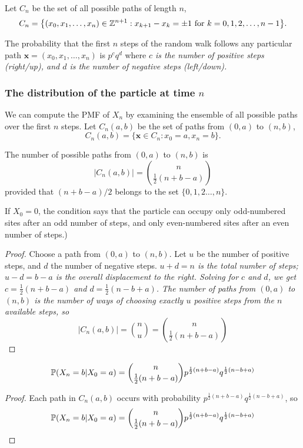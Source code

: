 Let $C_n$ be the set of all possible paths of length $n$,
\[
C_n = \big\{(x_0,x_1,\ldots,x_n)\in\mathbb{Z}^{n+1}: x_{k+1}-x_k = \pm 1\text{ for } k=0,1,2,\ldots,n-1\big\}.
\]

The probability that the first $n$ steps of the random walk follows any particular path $\mathbf{x}=(x_0,x_1,\ldots,x_n)$ is $p^cq^d$ where
\bit
\it $c$ is the number of positive steps (right/up), and
\it $d$ is the number of negative steps (left/down).
\eit

\subsubsection{The distribution of the particle at time $n$}
We can compute the PMF of $X_n$ by examining the ensemble of all possible paths over the first $n$ steps. Let $C_n(a,b)$ be the set of paths from $(0,a)$ to $(n,b)$,
\[
C_n(a,b) = \big\{\mathbf{x}\in C_n: x_0=a, x_n=b\}.
\]

\begin{lemma}
The number of possible paths from $(0,a)$ to $(n,b)$ is 
\[
|C_n(a,b)| = \binom{n}{\frac{1}{2}(n+b-a)}
\]
provided that $(n+b-a)/2$ belongs to the set $\{0,1,2\ldots,n\}$. 
\end{lemma}
If $X_0=0$, the condition says that the particle can occupy only odd-numbered sites after an odd number of steps, and only even-numbered sites after an even number of steps.)

\begin{proof}
Choose a path from $(0,a)$ to $(n,b)$. Let $u$ be the number of positive steps, and $d$ the number of negative steps.
\bit
\it $u+d=n$ is the total number of steps;
\it $u-d=b-a$ is the overall displacement to the right.
\eit
Solving for $c$ and $d$, we get $c=\frac{1}{2}(n+b-a)$ and $d=\frac{1}{2}(n-b+a)$. The number of paths from $(0,a)$ to $(n,b)$ is the number of ways of choosing exactly $u$ positive steps from the $n$ available steps, so
\[
|C_n(a,b)| = \binom{n}{u} = \binom{n}{\frac{1}{2}(n+b-a)}
\]
\end{proof}

\begin{corollary}
\[
\mathbb{P}(X_n=b|X_0=a) = \binom{n}{\frac{1}{2}(n+b-a)}p^{\frac{1}{2}(n+b-a)}q^{\frac{1}{2}(n-b+a)}
\]
\end{corollary}
\begin{proof}
Each path in $C_n(a,b)$ occurs with probability $p^{\frac{1}{2}(n+b-a)}q^{\frac{1}{2}(n-b+a)}$, so
\[
\mathbb{P}(X_n=b|X_0=a) = \binom{n}{\frac{1}{2}(n+b-a)}p^{\frac{1}{2}(n+b-a)}q^{\frac{1}{2}(n-b+a)}
\]
\end{proof}

